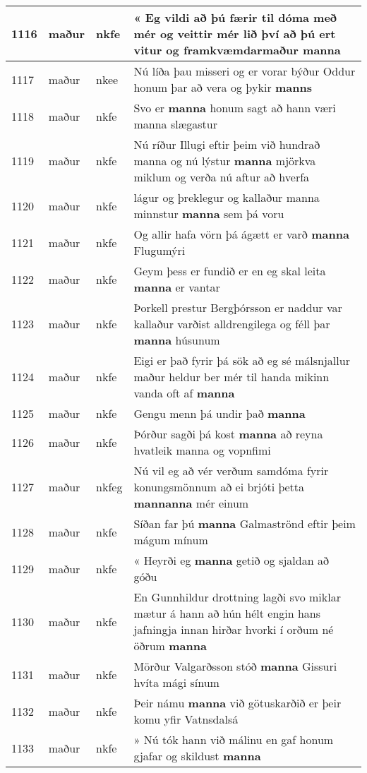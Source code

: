 \documentclass{article}
\begin{document}
\begin{longtable}{p{1cm}|p{1cm}|p{1cm}|p{13cm}}
\hline
1116&maður&nkfe&« Eg vildi að þú færir til dóma með mér og veittir mér lið því að þú ert vitur og framkvæmdarmaður \textbf{manna} \\
\hline
1117&maður&nkee&Nú líða þau misseri og er vorar býður Oddur honum þar að vera og þykir \textbf{manns} \\
\hline
1118&maður&nkfe&Svo er \textbf{manna} honum sagt að hann væri manna slægastur\\
\hline
1119&maður&nkfe&Nú ríður Illugi eftir þeim við hundrað manna og nú lýstur \textbf{manna} mjörkva miklum og verða nú aftur að hverfa\\
\hline
1120&maður&nkfe&lágur og þreklegur og kallaður manna minnstur \textbf{manna} sem þá voru\\
\hline
1121&maður&nkfe&Og allir hafa vörn þá ágætt er varð \textbf{manna} Flugumýri\\
\hline
1122&maður&nkfe&Geym þess er fundið er en eg skal leita \textbf{manna} er vantar\\
\hline
1123&maður&nkfe&Þorkell prestur Bergþórsson er naddur var kallaður varðist alldrengilega og féll þar \textbf{manna} húsunum\\
\hline
1124&maður&nkfe&Eigi er það fyrir þá sök að eg sé málsnjallur maður heldur ber mér til handa mikinn vanda oft af \textbf{manna} \\
\hline
1125&maður&nkfe&Gengu menn þá undir það \textbf{manna} \\
\hline
1126&maður&nkfe&Þórður sagði þá kost \textbf{manna} að reyna hvatleik manna og vopnfimi\\
\hline
1127&maður&nkfeg&Nú vil eg að vér verðum samdóma fyrir konungsmönnum að ei brjóti þetta \textbf{mannanna} mér einum\\
\hline
1128&maður&nkfe&Síðan far þú \textbf{manna} Galmaströnd eftir þeim mágum mínum\\
\hline
1129&maður&nkfe&« Heyrði eg \textbf{manna} getið og sjaldan að góðu\\
\hline
1130&maður&nkfe&En Gunnhildur drottning lagði svo miklar mætur á hann að hún hélt engin hans jafningja innan hirðar hvorki í orðum né öðrum \textbf{manna} \\
\hline
1131&maður&nkfe&Mörður Valgarðsson stóð \textbf{manna} Gissuri hvíta mági sínum\\
\hline
1132&maður&nkfe&Þeir námu \textbf{manna} við götuskarðið er þeir komu yfir Vatnsdalsá\\
\hline
1133&maður&nkfe&» Nú tók hann við málinu en gaf honum gjafar og skildust \textbf{manna} \\

\end{longtable}
\end{document}
